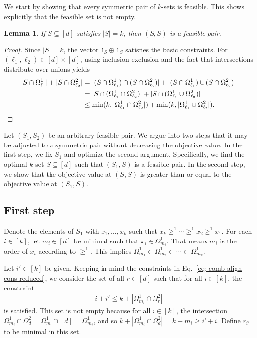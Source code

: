 \documentclass[12pt]{article}
\newtheorem{lem}[thm]{Lemma}
\theoremstyle{definition}
\numberwithin{equation}{section}
\numberwithin{equation}{section}
\newcommand{\one}{\mathtt{1}}
\newcommand{\Og}{\Omega}
\begin{document}
We start by showing that every symmetric pair of \(k\)-sets is feasible. This shows explicitly that the feasible set is not empty. 
\begin{lem}
\label{lem: every sym pair is feasible}
If \(S \subseteq [d]\) satisfies \(|S| = k\), then \((S, S)\) is a feasible pair. 
\end{lem}
\begin{proof}
Since \(|S| = k\), the vector \(\one_S \oplus \one_S\) satisfies the basic constraints. For \((\ell_1, \ell_2) \in [d] \times [d]\), using inclusion-exclusion and the fact that intersections distribute over unions yields
\begin{align*}
|S \cap \Og^1_{\ell_1}| + |S \cap \Og^2_{\ell_2}| &= | (S \cap \Og^1_{\ell_1}) \cap (S \cap \Og^2_{\ell_2})| + | (S \cap \Og^1_{\ell_1}) \cup (S \cap \Og^2_{\ell_2})| \\
&= | S \cap (\Og^1_{\ell_1} \cap \Og^2_{\ell_2})| + | S \cap (\Og^1_{\ell_1} \cup \Og^2_{\ell_2})| \\
&\leq  \min(k, | \Og^{1}_{\ell_1} \cap \Og^{2}_{\ell_2} |) + \min(k, |\Og^{1}_{\ell_1} \cup \Og^{2}_{\ell_2}|). \qedhere \end{align*} \end{proof}


Let \((S_1, S_2)\) be an arbitrary feasible pair. We argue into two steps that it may be adjusted to a symmetric pair without decreasing the objective value. In the first step, we fix \(S_1\) and optimize the second argument. Specifically, we find the optimal \(k\)-set \(S \subseteq [d]\) such that \((S_1, S)\) is a feasible pair. In the second step, we show that the objective value at \((S, S)\) is greater than or equal to the objective value at \((S_1, S)\). 


\subsection{First step}
\label{subsubsec: first}

Denote the elements of \(S_1\) with \( x_1, \ldots, x_k\) such that \(x_k \geq^1 \cdots \geq^1 x_2 \geq^1 x_1\). For each \(i \in [k]\), let \(m_{i} \in [d]\) be minimal such that \(x_i \in \Og^1_{m_i}\). That means \(m_i\) is the order of \(x_i\) according to \(\geq^1\). This implies \(\Og^1_{m_1} \subset \Og^1_{m_2} \subset \cdots \subset \Og^1_{m_k}\). 

Let \(i' \in [k]\) be given. Keeping in mind the constraints in Eq.~\ref{eq: comb align cons reduced}, we consider the set of all \(r \in [d]\) such that for all \(i \in [k]\), the constraint 
\begin{align}
\label{eq: constraint for first step}
i + i' \leq k + | \Og^1_{m_i} \cap \Og^2_{r}|
\end{align}
is satisfied. This set is not empty because for all \(i \in [k]\), the intersection \(\Og^1_{m_i} \cap \Og^2_{d} = {\Og^1_{m_i}} \cap {[d]} = \Og^1_{m_i}\), and so \(k + | \Og^1_{m_i} \cap \Og^2_{d}| = k + m_i \geq i' + i\). Define \(r_{i'}\) to be minimal in this set. 
\end{document}

